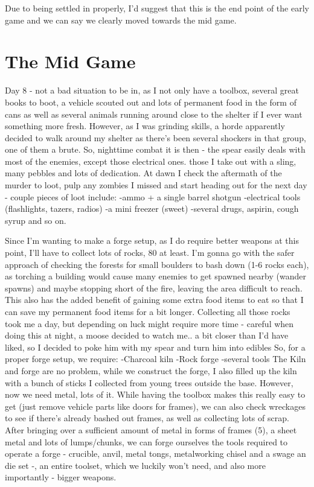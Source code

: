 \documentclass[11pt]{report}
\begin{document}
Due to being settled in properly, I'd suggest that this is the end point of the early game and we can say we clearly moved towards the mid game.

\section{The Mid Game}

Day 8 - not a bad situation to be in, as I not only have a toolbox, several great books to boot, a vehicle scouted out and lots of permanent food in the form of cans as well as several animals running around close to the shelter if I ever want something more fresh.
However, as I was grinding skills, a horde apparently decided to walk around my shelter as there's been several shockers in that group, one of them a brute. So, nighttime combat it is then - the spear easily deals with most of the enemies, except those electrical ones. those I take out with a sling, many pebbles and lots of dedication. At dawn I check the aftermath of the murder to loot, pulp any zombies I missed and start heading out for the next day - couple pieces of loot include:
-ammo + a single barrel shotgun
-electrical tools (flashlights, tazers, radios)
-a mini freezer (sweet)
-several drugs, aspirin, cough syrup and so on.

Since I'm wanting to make a forge setup, as I do require better weapons at this point, I'll have to collect lots of rocks, 80 at least. I'm gonna go with the safer approach of checking the forests for small boulders to bash down (1-6 rocks each), as torching a building would cause many enemies to get spawned nearby (wander spawns) and maybe stopping short of the fire, leaving the area difficult to reach.
This also has the added benefit of gaining some extra food items to eat so that I can save my permanent food items for a bit longer.
Collecting all those rocks took me a day, but depending on luck might require more time - careful when doing this at night, a moose decided to watch me.. a bit closer than I'd have liked, so I decided to poke him with my spear and turn him into edibles
So, for a proper forge setup, we require:
-Charcoal kiln
-Rock forge
-several tools
The Kiln and forge are no problem, while we construct the forge, I also filled up the kiln with a bunch of sticks I collected from young trees outside the base.
However, now we need metal, lots of it. While having the toolbox makes this really easy to get (just remove vehicle parts like doors for frames), we can also check wreckages to see if there's already bashed out frames, as well as collecting lots of scrap. After bringing over a sufficient amount of metal in forms of frames (5), a sheet metal and lots of lumps/chunks, we can forge ourselves the tools required to operate a forge - crucible, anvil, metal tongs, metalworking chisel and a swage an die set -, an entire toolset, which we luckily won't need, and also more importantly - bigger weapons.
\end{document}
